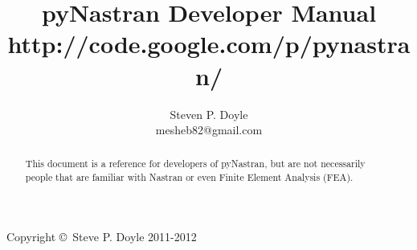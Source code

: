 \documentclass[a4paper,12pt]{article}
\begin{document}
\title{pyNastran Developer Manual \\
\small http://code.google.com/p/pynastran/ }
\author{Steven P. Doyle\\
{\small mesheb82@gmail.com}
}

\maketitle

\begin{abstract}
This document is a reference for developers of pyNastran, but are not
necessarily people that are familiar with Nastran or even Finite Element
Analysis (FEA).
\end{abstract}

Copyright \copyright\ Steve P. Doyle 2011-2012
\newpage

\tableofcontents
\newpage


\newpage

%

%



%
%
%
%

%
%
\end{document}
